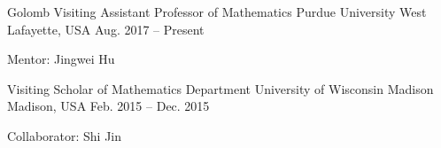 

\begin{cventries}

  \cventry
    {Golomb Visiting Assistant Professor of Mathematics} %
    {Purdue University} %
    {West Lafayette, USA} %
    {Aug. 2017 -- Present} %
    {
      \begin{cvitems} %
        \item {Mentor: Jingwei Hu}
      \end{cvitems}
    }

  \cventry
    {Visiting Scholar of Mathematics Department} %
    {University of Wisconsin Madison} %
    {Madison, USA} %
    {Feb. 2015 -- Dec. 2015} %
    {
      \begin{cvitems} %
        \item {Collaborator: Shi Jin}
      \end{cvitems}
    }

\end{cventries}
